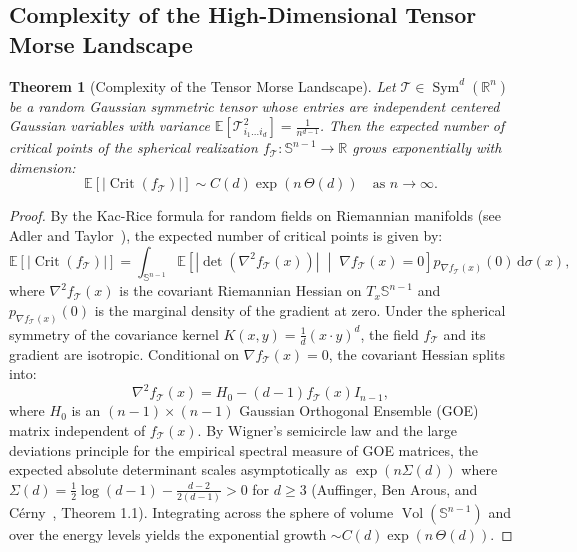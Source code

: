 \documentclass[11pt,a4paper,reqno]{amsart}
\newtheorem{theorem}{Theorem}[section]
\theoremstyle{definition}
\numberwithin{equation}{section}
\providecommand{\R}{\mathbb{R}}
\providecommand{\Sph}{\mathbb{S}}
\newcommand{\dif}{\,\mathrm{d}}
\providecommand{\Sph}{\mathbb{S}}
\providecommand{\R}{\mathbb{R}}
\begin{document}
\subsection{Complexity of the High-Dimensional Tensor Morse Landscape}
\label{subsec:kac_rice_tensors}

\begin{theorem}[Complexity of the Tensor Morse Landscape]
\label{thm:kac_rice_tensors}
Let $\mathcal{T} \in \operatorname{Sym}^d(\R^n)$ be a random Gaussian symmetric tensor whose entries are independent centered Gaussian variables with variance $\mathbb{E}[\mathcal{T}_{i_1 \dots i_d}^2] = \frac{1}{n^{d-1}}$. Then the expected number of critical points of the spherical realization $f_{\mathcal{T}} \colon \Sph^{n-1} \to \R$ grows \emph{exponentially} with dimension:
\begin{equation}
    \mathbb{E}[|\operatorname{Crit}(f_{\mathcal{T}})|] \sim C(d) \exp\left( n \, \Theta(d) \right) \quad \text{as } n \to \infty.
\end{equation}
\end{theorem}
\begin{proof}
By the Kac-Rice formula for random fields on Riemannian manifolds (see Adler and Taylor~\cite{adler2007random}), the expected number of critical points is given by:
\begin{equation}
    \mathbb{E}[|\operatorname{Crit}(f_{\mathcal{T}})|] = \int_{\Sph^{n-1}} \mathbb{E}\left[ |\det(\nabla^2 f_{\mathcal{T}}(x))| \;\middle|\; \nabla f_{\mathcal{T}}(x) = 0 \right] p_{\nabla f_{\mathcal{T}}(x)}(0) \dif \sigma(x),
\end{equation}
where $\nabla^2 f_{\mathcal{T}}(x)$ is the covariant Riemannian Hessian on $T_x \Sph^{n-1}$ and $p_{\nabla f_{\mathcal{T}}(x)}(0)$ is the marginal density of the gradient at zero. Under the spherical symmetry of the covariance kernel $K(x, y) = \frac{1}{d} (x \cdot y)^d$, the field $f_{\mathcal{T}}$ and its gradient are isotropic. Conditional on $\nabla f_{\mathcal{T}}(x) = 0$, the covariant Hessian splits into:
\begin{equation}
    \nabla^2 f_{\mathcal{T}}(x) = H_0 - (d-1) f_{\mathcal{T}}(x) I_{n-1},
\end{equation}
where $H_0$ is an $(n-1) \times (n-1)$ Gaussian Orthogonal Ensemble (GOE) matrix independent of $f_{\mathcal{T}}(x)$. By Wigner's semicircle law and the large deviations principle for the empirical spectral measure of GOE matrices, the expected absolute determinant scales asymptotically as $\exp(n \Sigma(d))$ where $\Sigma(d) = \frac{1}{2} \log(d-1) - \frac{d-2}{2(d-1)} > 0$ for $d \ge 3$ (Auffinger, Ben Arous, and C\'erny~\cite{auffinger2013random}, Theorem 1.1). Integrating across the sphere of volume $\operatorname{Vol}(\Sph^{n-1})$ and over the energy levels yields the exponential growth $\sim C(d) \exp(n \, \Theta(d))$.
\end{proof}
\end{document}
